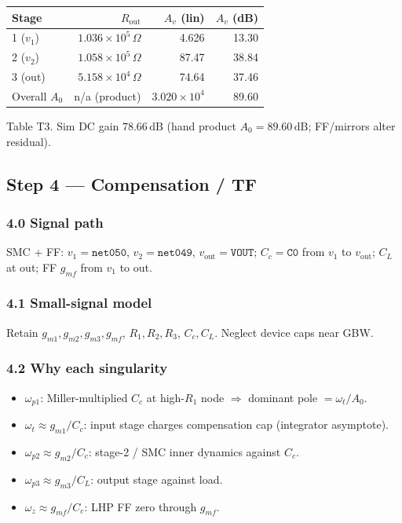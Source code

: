 \documentclass[11pt]{article}
\begin{document}
\begin{center}
\begin{tabular}{lrrr}
\toprule
Stage & \(R_{\mathrm{out}}\) & \(A_v\) (lin) & \(A_v\) (dB) \\
\midrule
1 (\(v_1\)) & \(1.036\times10^{5}\,\Omega\) & 4.626 & 13.30 \\
2 (\(v_2\)) & \(1.058\times10^{5}\,\Omega\) & 87.47 & 38.84 \\
3 (out) & \(5.158\times10^{4}\,\Omega\) & 74.64 & 37.46 \\
Overall \(A_0\) & n/a (product) & \(3.020\times10^{4}\) & 89.60 \\
\bottomrule
\end{tabular}
\end{center}
\footnotesize Table T3. Sim DC gain \(78.66\,\mathrm{dB}\) (hand product \(A_0=89.60\,\mathrm{dB}\); FF/mirrors alter residual).

\subsection{Step 4 --- Compensation / TF}
\subsubsection{4.0 Signal path}
SMC + FF: \(v_1=\texttt{net050}\), \(v_2=\texttt{net049}\), \(v_{\mathrm{out}}=\texttt{VOUT}\); \(C_c=\texttt{C0}\) from \(v_1\) to \(v_{\mathrm{out}}\); \(C_L\) at out; FF \(g_{mf}\) from \(v_1\) to out.

\subsubsection{4.1 Small-signal model}
Retain \(g_{m1},g_{m2},g_{m3},g_{mf}\), \(R_1,R_2,R_3\), \(C_c,C_L\). Neglect device caps near GBW.

\subsubsection{4.2 Why each singularity}
\begin{itemize}
\item \(\omega_{p1}\): Miller-multiplied \(C_c\) at high-\(R_1\) node \(\Rightarrow\) dominant pole \(=\omega_t/A_0\).
\item \(\omega_t\approx g_{m1}/C_c\): input stage charges compensation cap (integrator asymptote).
\item \(\omega_{p2}\approx g_{m2}/C_c\): stage-2 / SMC inner dynamics against \(C_c\).
\item \(\omega_{p3}\approx g_{m3}/C_L\): output stage against load.
\item \(\omega_z\approx g_{mf}/C_c\): LHP FF zero through \(g_{mf}\).
\end{itemize}
\end{document}
